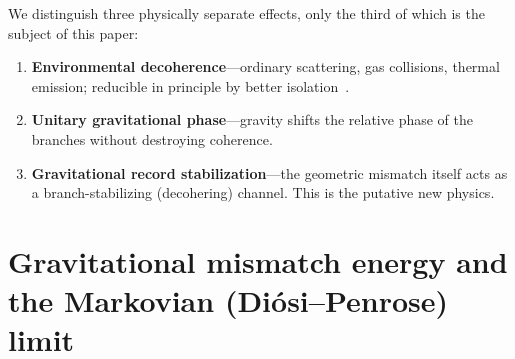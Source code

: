 \documentclass[aps,prd,onecolumn,amsmath,amssymb,nofootinbib,superscriptaddress]{revtex4-2}
\begin{document}
We distinguish three physically separate effects, only the third of which is the subject of this paper:
\begin{enumerate}
\item \textbf{Environmental decoherence}---ordinary scattering, gas collisions, thermal emission;
reducible in principle by better isolation~\cite{R14,R16}.
\item \textbf{Unitary gravitational phase}---gravity shifts the relative phase of the branches
without destroying coherence.
\item \textbf{Gravitational record stabilization}---the geometric mismatch itself acts as a
branch-stabilizing (decohering) channel. This is the putative new physics.
\end{enumerate}

\section{Gravitational mismatch energy and the Markovian (Di\'osi--Penrose) limit}\label{sec:dp}
\end{document}
